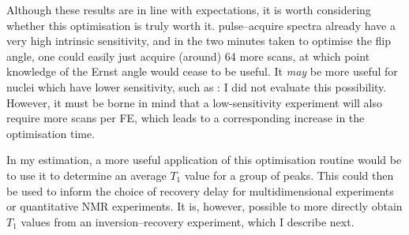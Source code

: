 Although these results are in line with expectations, it is worth considering whether this optimisation is truly worth it.
\proton{} pulse--acquire spectra already have a very high intrinsic sensitivity, and in the two minutes taken to optimise the flip angle, one could easily just acquire (around) 64 more scans, at which point knowledge of the Ernst angle would cease to be useful.
It \textit{may} be more useful for nuclei which have lower sensitivity, such as \carbon{}: I did not evaluate this possibility.
However, it must be borne in mind that a low-sensitivity experiment will also require more scans per FE, which leads to a corresponding increase in the optimisation time.

In my estimation, a more useful application of this optimisation routine would be to use it to determine an average $T_1$ value for a group of peaks.
This could then be used to inform the choice of recovery delay for multidimensional experiments\autocite{Reynolds2002JNP,Burns2021MRC} or quantitative NMR experiments\autocite{Pauli2005JNP,Giraudeau2014MRC}.
It is, however, possible to more directly obtain $T_1$ values from an inversion--recovery experiment, which I describe next.
